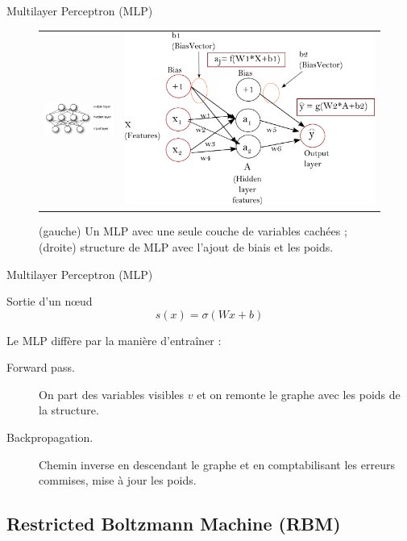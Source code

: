 \begin{frame}{Multilayer Perceptron (MLP)}
\begin{figure}[ht!]
\centering
\begin{tabular}{cc}
\includegraphics[width = .5\columnwidth]{../fig/mlp} &
\includegraphics[width = .5\columnwidth]{../fig/backprop_notation.png} 
\end{tabular}
\caption{(gauche) Un MLP avec une seule couche de variables cachées ; (droite) structure de MLP avec l'ajout de biais et les poids.}
\label{fig2}
\end{figure}
\end{frame}



\begin{frame}{Multilayer Perceptron (MLP)}
\begin{block}{Sortie d'un nœud}
\begin{equation}
s(x) = \sigma(Wx + b)
\end{equation}
\end{block}
Le MLP diffère par la manière d'entraîner :
\begin{description}
\item[Forward pass. ]On part des variables visibles $v$ et on remonte le graphe avec les poids de la structure.
\item[Backpropagation. ]Chemin inverse en descendant le graphe et en comptabilisant les erreurs commises, mise à jour les poids.
\end{description}
\end{frame}



\subsection{Restricted Boltzmann Machine (RBM)}


